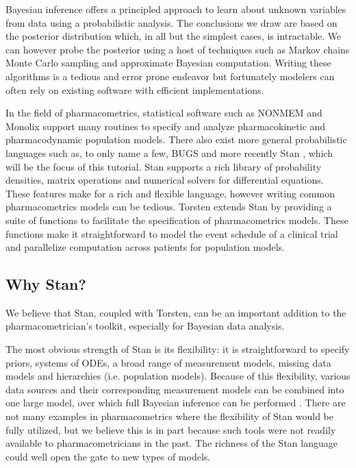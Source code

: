 
Bayesian inference offers a principled approach to learn about unknown variables from data using a probabilistic analysis.
The conclusions we draw are based on the posterior distribution which, in all but the simplest cases, is intractable.
We can however probe the posterior using a host of techniques such as Markov chains Monte Carlo sampling and approximate Bayesian computation.
Writing these algorithms is a tedious and error prone endeavor but fortunately modelers can often rely on existing software with efficient implementations.

In the field of pharmacometrics, statistical software such as NONMEM \cite{author:0000} and Monolix \cite{author:0000} support many routines to specify and analyze pharmacokinetic and pharmacodynamic population models.
There also exist more general probabilistic languages such as, to only name a few, BUGS \cite{author:0000} and more recently Stan \cite{Carpenter:2017}, which will be the focus of this tutorial.
Stan supports a rich library of probability densities, matrix operations and numerical solvers for differential equations.
These features make for a rich and flexible language, however writing common pharmacometrics models can be tedious.
Torsten extends Stan by providing a suite of functions to facilitate the specification of pharmacometrics models.
These functions make it straightforward to model the event schedule of a clinical trial and parallelize computation across patients for population models.


\subsection{Why Stan?}

We believe that Stan, coupled with Torsten, can be an important addition to the pharmacometrician's toolkit, especially for Bayesian data analysis.

The most obvious strength of Stan is its flexibility: it is straightforward to specify priors, systems of ODEs, a broad range of measurement models, missing data models and hierarchies (i.e. population models).
Because of this flexibility, various data sources and their corresponding measurement models can be combined into one large model, over which full Bayesian inference can be performed \cite[e.g][]{Weber:2018}.
There are not many examples in pharmacometrics where the flexibility of Stan would be fully utilized, but we believe this is in part because such tools were not readily available to pharmacometricians in the past.
The richness of the Stan language could well open the gate to new types of models.

